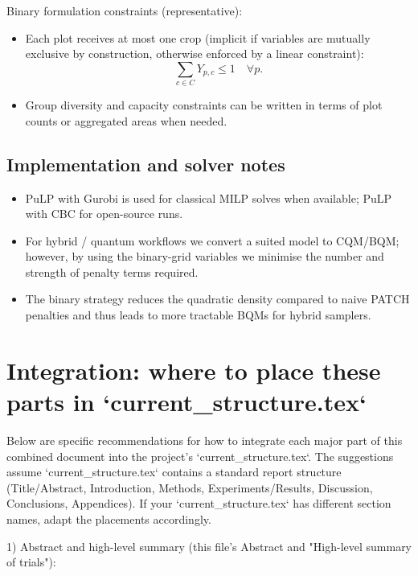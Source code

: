 \documentclass[11pt,a4paper]{article}
\begin{document}
Binary formulation constraints (representative):
\begin{itemize}
    \item Each plot receives at most one crop (implicit if variables are mutually exclusive by construction, otherwise enforced by a linear constraint):
    \begin{equation}
    \sum_{c \in C} Y_{p,c} \le 1 \quad \forall p.
    \end{equation}
    \item Group diversity and capacity constraints can be written in terms of plot counts or aggregated areas when needed.
\end{itemize}

\subsection{Implementation and solver notes}
\begin{itemize}
    \item PuLP with Gurobi is used for classical MILP solves when available; PuLP with CBC for open-source runs.
    \item For hybrid / quantum workflows we convert a suited model to CQM/BQM; however, by using the binary-grid variables we minimise the number and strength of penalty terms required.
    \item The binary strategy reduces the quadratic density compared to naive PATCH penalties and thus leads to more tractable BQMs for hybrid samplers.
\end{itemize}

\section{Integration: where to place these parts in `current_structure.tex`}

Below are specific recommendations for how to integrate each major part of this combined document into the project's `current_structure.tex`. The suggestions assume `current_structure.tex` contains a standard report structure (Title/Abstract, Introduction, Methods, Experiments/Results, Discussion, Conclusions, Appendices). If your `current_structure.tex` has different section names, adapt the placements accordingly.

1) Abstract and high-level summary (this file's Abstract and "High-level summary of trials"):
\end{document}
